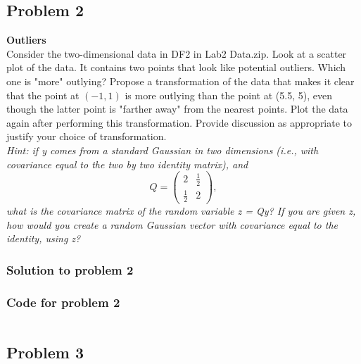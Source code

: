\documentclass[12pt]{article}%
\begin{document}
\subsection{Problem 2}

\textbf{Outliers}\\

Consider the two-dimensional data in DF2 in Lab2 Data.zip. Look at a scatter plot of the data. It contains two points that look like potential outliers. Which one is "more" outlying? Propose a transformation of the data that makes it clear that the point at $(-1, 1)$ is more outlying than the point at (5.5, 5), even though the latter point is "farther away" from the nearest points. Plot the data again after performing this transformation. Provide discussion as appropriate to justify your choice of transformation.\\

\noindent\textit{Hint: if y comes from a standard Gaussian in two dimensions (i.e., with covariance equal to the two by two identity matrix), and
\begin{equation*}
    Q = \begin{pmatrix}2 & \frac{1}{2}\\\frac{1}{2} & 2\end{pmatrix},
\end{equation*}
what is the covariance matrix of the random variable z = Qy? If you are given z, how would you create a random Gaussian vector with covariance equal to the identity, using z?}\\

\subsubsection{Solution to problem 2}



\subsubsection{Code for problem 2}
\begin{lstlisting}

\end{lstlisting}


\subsection{Problem 3}
\end{document}
